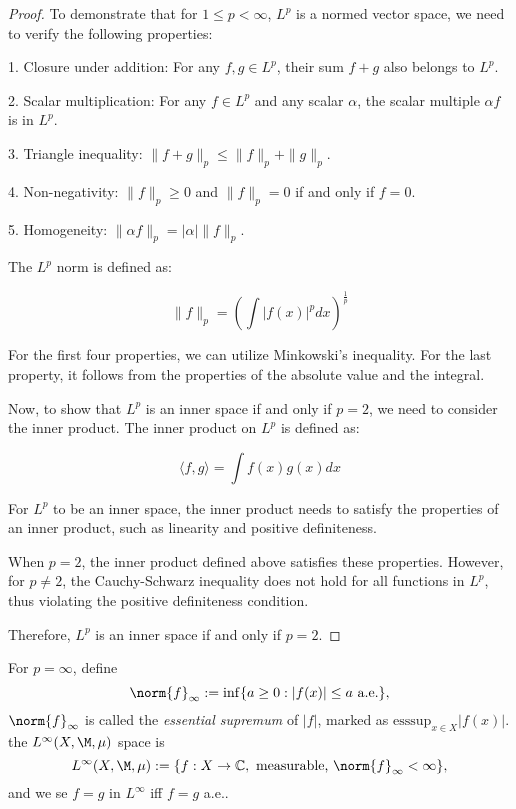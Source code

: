 \begin{proof}
    To demonstrate that for $1\leq p<\infty$, $L^{p}$ 
    is a normed vector space, we need to verify the 
    following properties:

    1. Closure under addition: For any \(f,g \in L^{p}\),
    their sum \(f+g\) also belongs to \(L^{p}\).
    
    2. Scalar multiplication: For any \(f \in L^{p}\) 
    and any scalar \(\alpha\), the scalar multiple \(\alpha f\) is in \(L^{p}\).
    
    3. Triangle inequality: \(\|f+g\|_{p} \leq \|f\|_{p} 
    + \|g\|_{p}\).
    
    4. Non-negativity: \(\|f\|_{p} \geq 0\) 
    and \(\|f\|_{p} = 0\) if and only if \(f = 0\).
    
    5. Homogeneity: \(\|\alpha f\|_{p} = |\alpha| 
    \|f\|_{p}\).

    The $L^{p}$ norm is defined as:

    $$
    \|f\|_{p} = \left( \int |f(x)|^{p} dx \right)^{\frac{1}{p}}
    $$

    For the first four properties, we can utilize Minkowski's 
    inequality. For the last property, it follows from the 
    properties of the absolute value and the integral.

    Now, to show that $L^{p}$ is an inner space if and only 
    if $p=2$, we need to consider the inner product. 
    The inner product on $L^{p}$ is defined as:

    $$
    \langle f,g \rangle = \int f(x)g(x) dx
    $$

    For $L^{p}$ to be an inner space, the inner product 
    needs to satisfy the properties of an inner product, 
    such as linearity and positive definiteness.

    When $p=2$, the inner product defined above satisfies 
    these properties. However, for $p \neq 2$, the 
    Cauchy-Schwarz inequality does not hold for all 
    functions in $L^{p}$, thus violating the positive 
    definiteness condition.

    Therefore, $L^{p}$ is an inner space if and only if $p=2$.
\end{proof}
\begin{defn}
    For $p=\infty$, define 
    \begin{displaymath}
        \norm{f}_{\infty}:=\inf\{a\ge 0:|f(x)|\le a\text{ a.e.}\},
    \end{displaymath}
    $\norm{f}_{\infty}$ is called the \textit{essential supremum} of 
    $|f|$, marked as $\text{esssup}_{x\in X}|f(x)|$. 
    the $L^{\infty}(X,\M,\mu)$ space is 
    \begin{displaymath}
        L^{\infty}(X,\M,\mu):=\{f:X\rightarrow\mathbb{C},
        \text{ measurable, }\norm{f}_{\infty}<\infty\},    
    \end{displaymath}
    and we se $f=g$ in $L^{\infty}$ iff $f=g$ a.e..
\end{defn}
